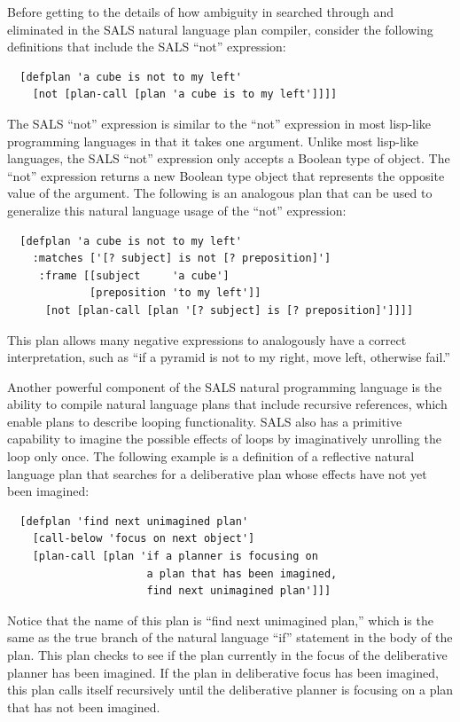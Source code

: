 Before getting to the details of how ambiguity in searched through and
eliminated in the SALS natural language plan compiler, consider the
following definitions that include the SALS ``not'' expression:
\begin{samepage}
\begin{Verbatim}
  [defplan 'a cube is not to my left'
    [not [plan-call [plan 'a cube is to my left']]]]
\end{Verbatim}
\end{samepage}
The SALS ``not'' expression is similar to the ``not'' expression in
most lisp-like programming languages in that it takes one argument.
Unlike most lisp-like languages, the SALS ``not'' expression only
accepts a Boolean type of object.  The ``not'' expression returns a
new Boolean type object that represents the opposite value of the
argument.  The following is an analogous plan that can be used to
generalize this natural language usage of the ``not'' expression:
\begin{samepage}
\begin{Verbatim}
  [defplan 'a cube is not to my left'
    :matches ['[? subject] is not [? preposition]']
     :frame [[subject     'a cube']
             [preposition 'to my left']]
      [not [plan-call [plan '[? subject] is [? preposition]']]]]
\end{Verbatim}
\end{samepage}
This plan allows many negative expressions to analogously have a
correct interpretation, such as ``if a pyramid is not to my right,
move left, otherwise fail.''

Another powerful component of the SALS natural programming language is
the ability to compile natural language plans that include recursive
references, which enable plans to describe looping functionality.
SALS also has a primitive capability to imagine the possible effects
of loops by imaginatively unrolling the loop only once.  The following
example is a definition of a reflective natural language plan that
searches for a deliberative plan whose effects have not yet been
imagined:
\begin{samepage}
\begin{Verbatim}
  [defplan 'find next unimagined plan'
    [call-below 'focus on next object']
    [plan-call [plan 'if a planner is focusing on
                      a plan that has been imagined,
                      find next unimagined plan']]]
\end{Verbatim}
\end{samepage}
Notice that the name of this plan is ``find next unimagined plan,''
which is the same as the true branch of the natural language ``if''
statement in the body of the plan.  This plan checks to see if the
plan currently in the focus of the deliberative planner has been
imagined.  If the plan in deliberative focus has been imagined, this
plan calls itself recursively until the deliberative planner is
focusing on a plan that has not been imagined.

